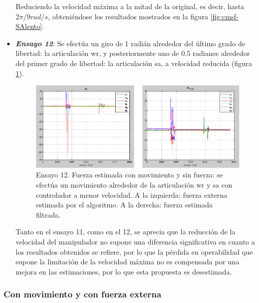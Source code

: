 \begin{itemize}
Reduciendo la velocidad máxima a la mitad de la original, es decir, hasta $2\pi/9 rad/s$, obteniéndose los resultados mostrados en la figura \ref{fig:cmsf-SAlento}. \par 

\item \textbf{\emph{Ensayo 12}}: Se efectúa un giro de 1 radián alrededor del último grado de libertad: la articulación \acrshort{wr}, y posteriormente uno de 0.5 radianes alrededor del primer grado de libertad: la articulación \acrshort{sa}, a velocidad reducida (figura \ref{fig:cmsf-WRSAlento}). \par 

\begin{figure}[h!]
\centering
\includegraphics[scale=0.4]{Figuras/cmsf-WRSAlento}
\caption[Ensayo 12. Fuerza estimada con movimiento y sin fuerza]{Ensayo 12. Fuerza estimada con movimiento y sin fuerza: se efectúa un movimiento alrededor de la articulación \acrshort{wr} y \acrshort{sa} con controlador a menor velocidad. A la izquierda: fuerza externa estimada por el algoritmo. A la derecha: fuerza estimada filtrada.}
\label{fig:cmsf-WRSAlento}
\end{figure}

Tanto en el ensayo 11, como en el 12, se aprecia que la reducción de la velocidad del manipulador no supone una diferencia significativa en cuanto a los resultados obtenidos se refiere, por lo que la pérdida en operabilidad que supone la limitación de la velocidad máxima no es compensada por una mejora en las estimaciones, por lo que esta propuesta es desestimada. \par 

\end{itemize}

\subsubsection{Con movimiento y con fuerza externa}

